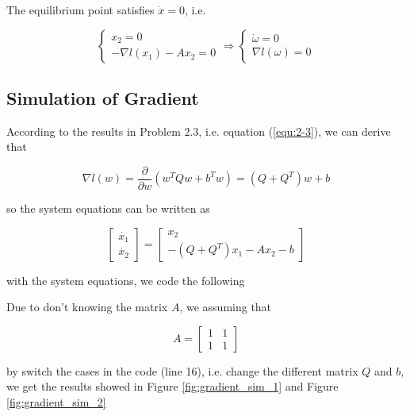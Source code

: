 \documentclass{article}
\begin{document}
The equilibrium point satisfies $\dot{x}=0$, i.e.

\begin{equation}
    \begin{cases}
        x_2=0\\
        -\nabla l(x_1)-Ax_2=0
    \end{cases}
    \Rightarrow
    \begin{cases}
        \dot{\omega}=0\\
        \nabla l(\omega)=0
    \end{cases}
\end{equation}

\subsection{Simulation of Gradient}

According to the results in Problem 2.3, i.e. equation (\ref{equ:2-3}), we can derive that

\begin{equation}
    \nabla l(w)=\frac{\partial}{\partial w}(w^TQw+b^Tw)=(Q+Q^T)w+b
\end{equation}

so the system equations can be written as

\begin{equation}
    \begin{bmatrix}
        \dot{x_1}\\\dot{x_2}
    \end{bmatrix}
    =\begin{bmatrix}
        x_2\\-(Q+Q^T)x_1-Ax_2-b
    \end{bmatrix}
\end{equation}

with the system equations, we code the following



Due to don't knowing the matrix $A$, we assuming that

\begin{equation}
    A=\begin{bmatrix}
        1 & 1 \\ 1 & 1
    \end{bmatrix}
\end{equation}

by switch the cases in the code (line 16),
i.e. change the different matrix $Q$ and $b$,
we get the results showed in Figure \ref{fig:gradient_sim_1} and Figure \ref{fig:gradient_sim_2}
\end{document}
